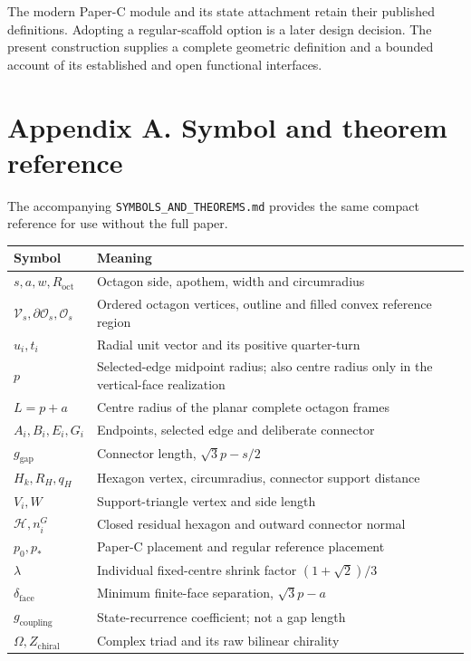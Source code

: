 \documentclass[
  11pt,
  a4paper,
]{article}
\newcounter{none} %
\begin{document}
The modern Paper-C module and its state attachment retain their published definitions. Adopting a regular-scaffold option is a later design decision. The present construction supplies a complete geometric definition and a bounded account of its established and open functional interfaces.

\appendix

\section{Appendix A. Symbol and theorem reference}\label{appendix-a.-symbol-and-theorem-reference}

The accompanying \texttt{SYMBOLS\_AND\_THEOREMS.md} provides the same compact reference for use without the full paper.

{\def\LTcaptype{none} %
\begin{longtable}[]{@{}
  >{\raggedright\arraybackslash}p{}
  >{\raggedright\arraybackslash}p{}@{}}
\toprule\noalign{}
\begin{minipage}[b]{\linewidth}\raggedright
Symbol
\end{minipage} & \begin{minipage}[b]{\linewidth}\raggedright
Meaning
\end{minipage} \\
\midrule\noalign{}
\endhead
\bottomrule\noalign{}
\endlastfoot
\(s,a,w,R_{\mathrm{oct}}\) & Octagon side, apothem, width and circumradius \\
\(\mathcal V_s,\partial\mathcal O_s,\mathcal O_s\) & Ordered octagon vertices, outline and filled convex reference region \\
\(u_i,t_i\) & Radial unit vector and its positive quarter-turn \\
\(p\) & Selected-edge midpoint radius; also centre radius only in the vertical-face realization \\
\(L=p+a\) & Centre radius of the planar complete octagon frames \\
\(A_i,B_i,E_i,G_i\) & Endpoints, selected edge and deliberate connector \\
\(g_{\mathrm{gap}}\) & Connector length, \(\sqrt3p-s/2\) \\
\(H_k,R_H,q_H\) & Hexagon vertex, circumradius, connector support distance \\
\(V_i,W\) & Support-triangle vertex and side length \\
\(\mathcal H,n_i^G\) & Closed residual hexagon and outward connector normal \\
\(p_0,p_*\) & Paper-C placement and regular reference placement \\
\(\lambda\) & Individual fixed-centre shrink factor \((1+\sqrt2)/3\) \\
\(\delta_{\mathrm{face}}\) & Minimum finite-face separation, \(\sqrt3p-a\) \\
\(g_{\mathrm{coupling}}\) & State-recurrence coefficient; not a gap length \\
\(\Omega,Z_{\mathrm{chiral}}\) & Complex triad and its raw bilinear chirality \\
\end{longtable}
}
\end{document}
